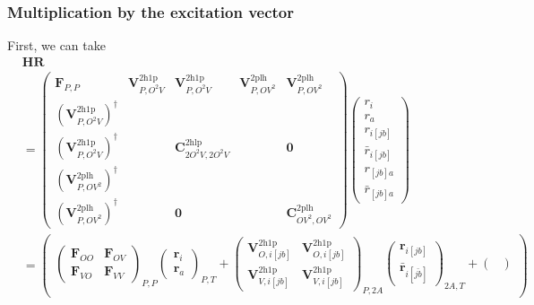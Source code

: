 \subsubsection{Multiplication by the excitation vector}
First, we can take
\begin{align}
&\bm{H}\bm{R}\\
&=
    \begin{pmatrix}
        \bm{F}_{P,P} & \bm{V}^{2\mathrm{h1p}}_{P,O^2V} & \bm{V}^{2\mathrm{h1p}}_{P,O^2V} & \bm{V}^{2\mathrm{plh}}_{P,OV^2} & \bm{V}^{2\mathrm{plh}}_{P,OV^2} \\
        \left(\bm{V}^{2\mathrm{h1p}}_{P,O^2V}\right)^{\dagger} &  &  & & \\
        \left(\bm{V}^{2\mathrm{h1p}}_{P,O^2V}\right)^{\dagger} &  & \bm{C}^{2\mathrm{hlp}}_{2O^2V,2O^2V} && \bm{0} \\
        \left(\bm{V}^{2\mathrm{plh}}_{P,OV^2}\right)^{\dagger} & & & & \\
        \left(\bm{V}^{2\mathrm{plh}}_{P,OV^2}\right)^{\dagger} &  & \bm{0} & & \bm{C}^{2\mathrm{plh}}_{OV^2,OV^2}
    \end{pmatrix}
    \begin{pmatrix}
        r_i \\
        r_a \\
        r_{i[jb]} \\
        \bar{r}_{i[jb]} \\
        r_{[jb]a}\\
\bar{r}_{[jb]a}
    \end{pmatrix} \\
&=
    \begin{pmatrix}
\begin{pmatrix}
        \bm{F}_{OO} & \bm{F}_{OV} \\ \bm{F}_{VO} & \bm{F}_{VV}
\end{pmatrix}_{P,P} \begin{pmatrix}
\bm{r}_i \\ \bm{r}_a
\end{pmatrix}_{P,T} + \begin{pmatrix}
\bm{V}^{2 \mathrm{h1p}}_{O,i[jb]} & \bm{V}^{2 \mathrm{h1p}}_{O,i[{jb}]} \\ \bm{V}^{2 \mathrm{h1p}}_{V,i[jb]} & \bm{V}^{2 \mathrm{h1p}}_{V,i[{jb}]} 
\end{pmatrix}_{P,2A} \begin{pmatrix}
    \bm{r}_{i[jb]} \\
\bm{\bar{r}}_{i[\bar{jb}]}
\end{pmatrix}_{2A,T}  + \begin{pmatrix}

\end{pmatrix}
\end{pmatrix}
\end{align}
